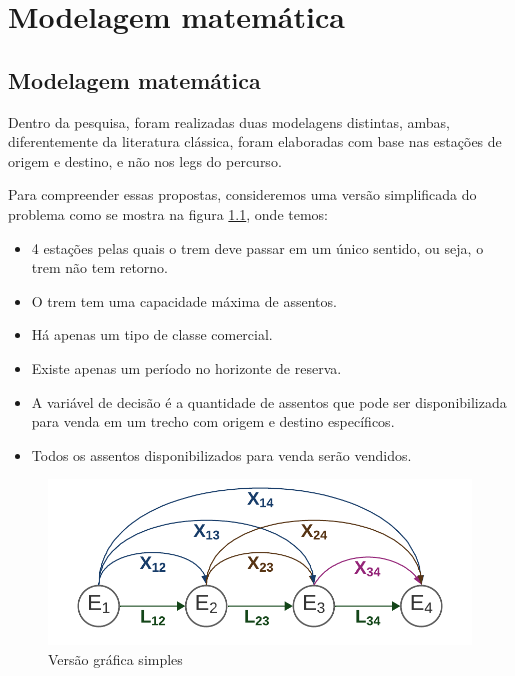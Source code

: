 \chapter{Modelagem matemática}

\section{Modelagem matemática}

Dentro da pesquisa, foram realizadas duas modelagens distintas, ambas, diferentemente da literatura clássica, foram elaboradas com base nas estações de origem e destino, e não nos legs do percurso.

Para compreender essas propostas, consideremos uma versão simplificada do problema como se mostra na figura \ref{fig: fig1}, onde temos:

\begin{itemize}
	\item 4 estações pelas quais o trem deve passar em um único sentido, ou seja, o trem não tem retorno.
	\item O trem tem uma capacidade máxima de assentos.
	\item Há apenas um tipo de classe comercial.
	\item Existe apenas um período no horizonte de reserva.
	\item A variável de decisão é a quantidade de assentos que pode ser disponibilizada para venda em um trecho com origem e destino específicos.
	\item Todos os assentos disponibilizados para venda serão vendidos.
\end{itemize}

\begin{figure}[th]
	\begin{center}
		\includegraphics[scale=0.7]{img/fig1.png}
		\caption{Versão gráfica simples}
		\label{fig: fig1}
	\end{center}
\end{figure}


